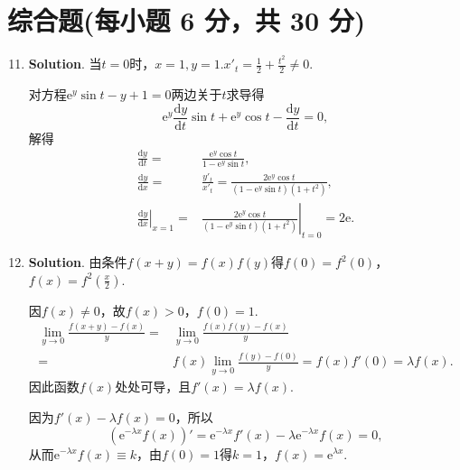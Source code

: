 \documentclass[../main.tex]{subfiles}
\begin{document}
\section{综合题(每小题 6 分，共 30 分)}
\begin{enumerate}
    \setcounter{enumi}{10}
    \item \textbf{Solution}. 当$t=0$时，$x=1,y=1$.$x'_{t}=\frac{1}{2}+\frac{t^{2}}{2}
              \neq0$.

          对方程$\mathrm{e}^{y}\sin t-y+1=0$两边关于$t$求导得
          \[
              \mathrm{e}^{y}\frac{\mathrm{d}y}{\mathrm{d}t}\sin t+\mathrm{e}^{y}\cos t-
              \frac{\mathrm{d}y}{\mathrm{d}t}=0,
          \]
          解得
          \[
              \begin{aligned}
                  \frac{\mathrm{d}y}{\mathrm{d}t}= {}                    & \frac{\mathrm{e}^y\cos t}{1-\mathrm{e}^y\sin t},                                          \\
                  \frac{\mathrm{d}y}{\mathrm{d}x}= {}                    & \frac{y'_t}{x'_t}=\frac{2\mathrm{e}^y\cos t}{(1-\mathrm{e}^y\sin t)(1+t^2)},              \\
                  \left.\frac{\mathrm{d}y}{\mathrm{d}x}\right|_{x=1}= {} & \left.\frac{2\mathrm{e}^y\cos t}{(1-\mathrm{e}^y\sin t)(1+t^2)}\right|_{t=0}=2\mathrm{e}.
              \end{aligned}
          \]

    \item \textbf{Solution}. 由条件$f(x+y)=f(x)f(y)$得$f(0)=f^{2}(0)$，$f(x)
              =f^{2}\left(\frac{x}{2}\right)$.

          因$f(x)\neq0$，故$f(x)>0$，$f(0)=1$.
          \[
              \begin{aligned}
                  \lim_{y\to0}\frac{f(x+y)-f(x)}{y}= {} & \lim_{y\to0}\frac{f(x)f(y)-f(x)}{y}                         \\
                  = {}                                  & f(x)\lim_{y\to0}\frac{f(y)-f(0)}{y}=f(x)f'(0)=\lambda f(x).
              \end{aligned}
          \]
          因此函数$f(x)$处处可导，且$f'(x)=\lambda f(x)$.

          因为$f'(x)-\lambda f(x)=0$，所以
          \[
              (\mathrm{e}^{-\lambda x}f(x))'=\mathrm{e}^{-\lambda x}f'(x)-\lambda \mathrm{e}
              ^{-\lambda x}f(x)=0,
          \]
          从而$\mathrm{e}^{-\lambda x}f(x)\equiv k$，由$f(0)=1$得$k=1$，$f(x)=\mathrm{e}
              ^{\lambda x}$.


\end{enumerate}
\end{document}
